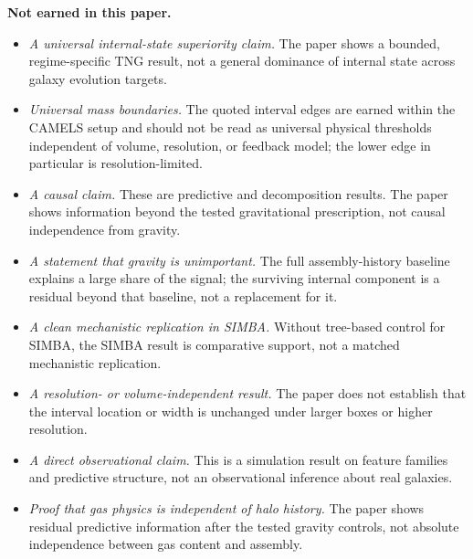 \documentclass[twocolumn,linenumbers]{aastex701}
\begin{document}
\medskip\noindent\textbf{Not earned in this paper.}
\begin{itemize}[leftmargin=*,itemsep=2pt]
  \item \textit{A universal internal-state superiority claim.}
    The paper shows a bounded, regime-specific TNG result, not a general
    dominance of internal state across galaxy evolution targets.

  \item \textit{Universal mass boundaries.}
    The quoted interval edges are earned within the CAMELS setup and should not
    be read as universal physical thresholds independent of volume, resolution,
    or feedback model; the lower edge in particular is resolution-limited.

  \item \textit{A causal claim.}
    These are predictive and decomposition results.  The paper shows information
    beyond the tested gravitational prescription, not causal independence from
    gravity.

  \item \textit{A statement that gravity is unimportant.}
    The full assembly-history baseline explains a large share of the signal;
    the surviving internal component is a residual beyond that baseline, not a
    replacement for it.

  \item \textit{A clean mechanistic replication in SIMBA.}
    Without tree-based control for SIMBA, the SIMBA result is comparative
    support, not a matched mechanistic replication.

  \item \textit{A resolution- or volume-independent result.}
    The paper does not establish that the interval location or width is
    unchanged under larger boxes or higher resolution.

  \item \textit{A direct observational claim.}
    This is a simulation result on feature families and predictive structure,
    not an observational inference about real galaxies.

  \item \textit{Proof that gas physics is independent of halo history.}
    The paper shows residual predictive information after the tested gravity
    controls, not absolute independence between gas content and assembly.
\end{itemize}

\end{document}
